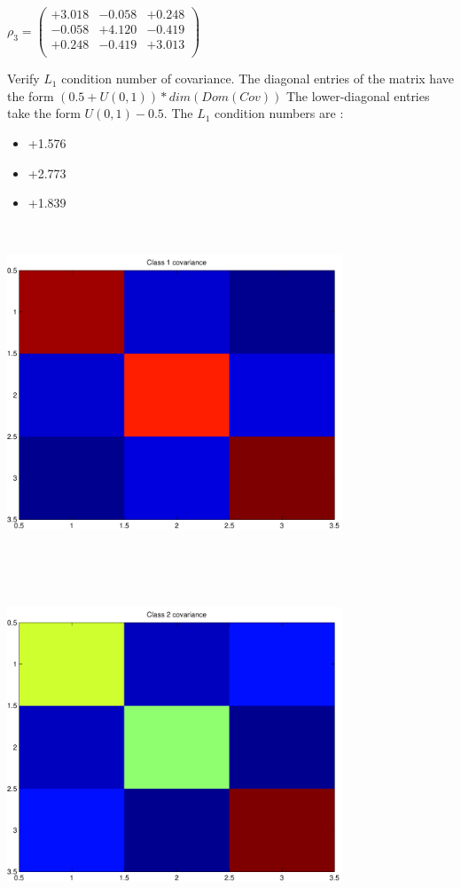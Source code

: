 \documentclass[9pt]{article}
\theoremstyle{plain}
\theoremstyle{definition}
\theoremstyle{remark}
\numberwithin{equation}{section}
\begin{document}
$\rho_3 = \left(
\begin{array}{
ccc}
+3.018 & -0.058 & +0.248 \\
-0.058 & +4.120 & -0.419 \\
+0.248 & -0.419 & +3.013 \\
\end{array}
\right)$ \newline 

Verify $L_1$ condition number of covariance. The diagonal entries of the matrix have the form $(0.5 + U(0,1) )*dim(Dom(Cov))$
The lower-diagonal entries take the form $U(0,1) - 0.5$. 
The $L_1$ condition numbers are :
\begin{itemize}
\item +1.576
\item +2.773
\item +1.839
\end{itemize}
\includegraphics[width=10.0cm,height=10.0cm]{rv1_corr.pdf}

\includegraphics[width=10.0cm,height=10.0cm]{rv2_corr.pdf}
\end{document}

